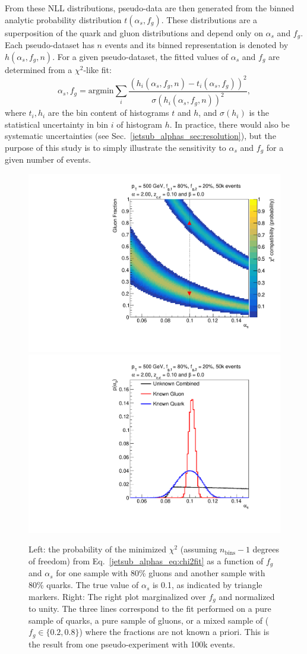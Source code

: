 \documentclass[11pt]{cernrep}
\begin{document}
From these NLL distributions, pseudo-data are then generated from the binned analytic probability distribution $t(\alpha_s,f_g)$.
%
These distributions are a superposition of the quark and gluon distributions and depend only on $\alpha_s$ and $f_g$.
%
Each pseudo-dataset has $n$ events and its binned representation is denoted by $h(\alpha_s,f_g,n)$.
%
For a given pseudo-dataset, the fitted values of $\alpha_s$ and $f_g$ are determined from a $\chi^2$-like fit:
%
\begin{equation}
\label{jetsub_alphas_eq:chi2fit}
\alpha_s,f_g=\mathrm{argmin} \sum_i \frac{\left(h_i(\alpha_s,f_g,n)-t_i(\alpha_s,f_g)\right)^2}{\sigma(h_i(\alpha_s,f_g,n))^2},
\end{equation}
%
where $t_i, h_i$ are the bin content of histograms $t$ and $h$, and $\sigma(h_i)$ is the statistical uncertainty in bin $i$ of histogram $h$.
%
In practice, there would also be systematic uncertainties (see Sec.~\ref{jetsub_alphas_sec:resolution}), but the purpose of this study is to simply illustrate the sensitivity to $\alpha_s$ and $f_g$ for a given number of events.


	
\begin{figure}[t]
\begin{center}
\includegraphics[width = 0.49\columnwidth]{jetsub_alphas_banana_alpha_20beta_0_zcut_123451324.pdf}
\includegraphics[width = 0.49\columnwidth]{jetsub_alphas_palpha_alpha_20beta_0_zcut_123451324.pdf}
\end{center}
\caption{Left: the probability of the minimized $\chi^2$ (assuming $n_\mathrm{bins}-1$ degrees of freedom) from Eq.~\eqref{jetsub_alphas_eq:chi2fit} as a
  function of $f_g$ and $\alpha_s$ for one sample with 80\% gluons and another sample with 80\% quarks.  The true value of $\alpha_s$ is 0.1, as indicated by triangle markers.  Right: The right plot marginalized over $f_g$ and normalized to unity.  The three lines correspond to the fit performed on a pure sample of quarks, a pure sample of gluons, or a mixed sample of ($f_g\in\{0.2,0.8\}$) where the fractions are not known a priori.  This is the result from one pseudo-experiment with 100k events.}
\label{jetsub_alphas_fig:alpha2fit}
\end{figure}
\end{document}

